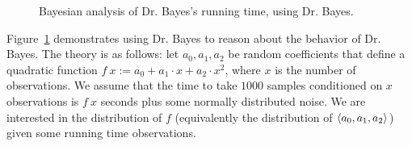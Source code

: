 \begin{figure}[p!]\centering%

\caption[Bayesian analysis of Dr. Bayes's running time, using Dr. Bayes]{Bayesian analysis of Dr. Bayes's running time, using Dr. Bayes.}%
\label{fig:quadratic-fit-bayesian}
\end{figure}

Figure~\ref{fig:quadratic-fit-bayesian} demonstrates using Dr. Bayes to reason about the behavior of Dr. Bayes.
The theory is as follows: let $a_0,a_1,a_2$ be random coefficients that define a quadratic function $f~x := a_0 + a_1 \cdot x + a_2 \cdot x^2$, where $x$ is the number of observations.
We assume that the time to take $1000$ samples conditioned on $x$ observations is $f~x$ seconds plus some normally distributed noise.
We are interested in the distribution of $f$ (equivalently the distribution of $\langle{a_0,a_1,a_2}\rangle$) given some running time observations.

